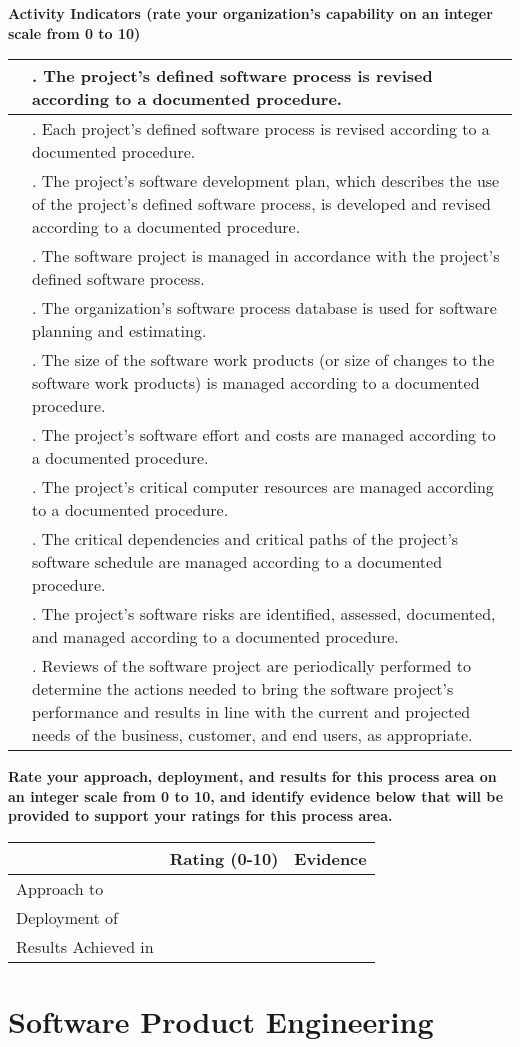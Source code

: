 \documentclass{article}
\newcommand{\KPAname}{}
\newenvironment{KPARate}[1]
	{\renewcommand{\KPAname}{#1}
	 {\bf Rate your approach, deployment, and results for
	  this process area on an integer scale from 0 to 10, and 
	  identify evidence below that will be provided to support your
	  ratings for this process area.}
	 \begin{center}
	 \begin{tabular}{|p{1.0in}|p{0.5in}|p{5.0in}|} \hline
	 & Rating (0-10) & \multicolumn{1}{c|}{Evidence} \\ \hline}
	{\end{tabular}
	 \end{center}}
\newcommand{\Approach}[2]{Approach to \KPAname & #1 & #2 \\ \hline}
\newcommand{\Deployment}[2]{Deployment of \KPAname & #1 & #2 \\ \hline}
\newcommand{\Results}[2]{Results Achieved in \KPAname & #1 & #2 \\
	\hline}
\newcounter{activity}
\newenvironment{KPAActivity}
	{
	 \setcounter{activity}{0}
	 {\bf Activity Indicators (rate your organization's capability
	 on an integer scale from 0 to 10)}
	 \begin{center}
	 \begin{tabular}{|p{0.5in}|p{6.0in}|} \hline
	}
	{
	 \end{tabular}
	 \end{center}
	}
\newcommand{\Activity}[2]{\stepcounter{activity} #1 &
\arabic{activity}. #2 \\ \hline}
\begin{document}
\begin{KPAActivity}
\Activity{}{The project's defined software process is revised
according to a documented procedure.}
\Activity{}{Each project's defined software process is revised
according to a documented procedure.}
\Activity{}{The project's software development plan, which describes
the use of the project's defined software process, is developed and
revised according to a documented procedure.}
\Activity{}{The software project is managed in accordance with the
project's defined software process.}
\Activity{}{The organization's software process database is used for
software planning and estimating.}
\Activity{}{The size of the software work products (or size of changes
to the software work products) is managed according to a documented
procedure.}
\Activity{}{The project's software effort and costs are managed
according to a documented procedure.}
\Activity{}{The project's critical computer resources are managed
according to a documented procedure.}
\Activity{}{The critical dependencies and critical paths of the
project's software schedule are managed according to a documented
procedure.}
\Activity{}{The project's software risks are identified, assessed,
documented, and managed according to a documented procedure.}
\Activity{}{Reviews of the software project are periodically performed
to determine the actions needed to bring the software project's
performance and results in line with the current and projected needs
of the business, customer, and end users, as appropriate.}
\end{KPAActivity}

\begin{KPARate}{Integrated Software Management}
\Approach{}{}
\Deployment{}{}
\Results{}{}
\end{KPARate}

\newpage
\section{Software Product Engineering}
\end{document}
